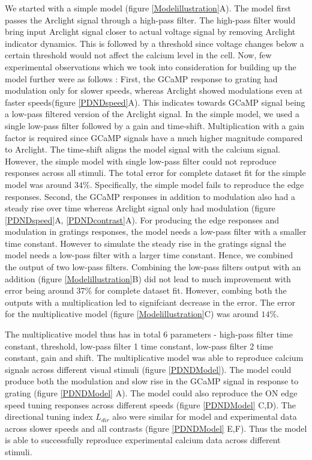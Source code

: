 \documentclass[9pt,lineno]{elife}
\begin{document}
We started with a simple model (figure \ref{Modelillustration}A). The model first passes the Arclight signal through a high-pass filter. The high-pass filter would bring input Arclight signal closer to actual voltage signal by removing Arclight indicator dynamics. This is followed by a threshold since voltage changes below a certain threshold would not affect the calcium level in the cell. Now, few experimental observations which we took into consideration for building up the model further were as follows : First, the GCaMP response to grating had modulation only for slower speeds, whereas Arclight showed modulations even at faster speeds(figure \ref{PDNDspeed}A). This indicates towards GCaMP signal being a low-pass filtered version of the Arclight signal. In the simple model, we used a single low-pass filter followed by a gain and time-shift. Multiplication with a gain factor is required since GCaMP signals have a much higher magnitude compared to Arclight. The time-shift aligns the model signal with the calcium signal. However, the simple model with single low-pass filter could not reproduce responses across all stimuli. The total error for complete dataset fit for the simple model was around $34\%$. Specifically, the simple model fails to reproduce the edge responses. Second, the GCaMP responses in addition to modulation also had a steady rise over time whereas Arclight signal only had modulation (figure \ref{PDNDspeed}A, \ref{PDNDcontrast}A). For producing the edge responses and modulation in gratings responses, the model needs a low-pass filter with a smaller time constant. However to simulate the steady rise in the gratings signal the model needs a low-pass filter with a larger time constant. Hence, we combined the output of two low-pass filters. Combining the low-pass filters output with an addition (figure \ref{Modelillustration}B) did not lead to much improvement with error being around $37\%$ for complete dataset fit. However, combing both the outputs with a multiplication led to signifciant decrease in the error. The error for the multiplicative model (figure \ref{Modelillustration}C) was around $14\%$. 

The multiplicative model thus has in total 6 parameters - high-pass filter time constant, threshold, low-pass filter 1 time constant, low-pass filter 2 time constant, gain and shift.  The multiplicative model was able to reproduce calcium signals across different visual stimuli (figure \ref{PDNDModel}). The model could produce both the modulation and slow rise in the GCaMP signal in response to grating (figure \ref{PDNDModel} A). The model could also reproduce the ON edge speed tuning responses across different speeds (figure \ref{PDNDModel} C,D). The directional tuning index $L_{dir}$ also were similar for model and experimental data across slower speeds and all contrasts (figure \ref{PDNDModel} E,F). Thus the model is able to successfully reproduce experimental calcium data across different stimuli.  
\end{document}
